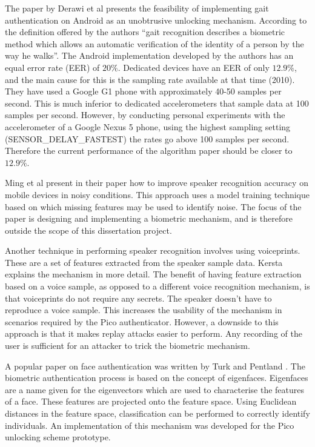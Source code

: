The paper by Derawi et al \cite{derawi2010unobtrusive} presents the feasibility of implementing gait authentication on Android as an unobtrusive unlocking mechanism. According to the definition offered by the authors ``gait recognition describes a biometric method which allows an automatic verification of the identity of a person by the way he walks''. The Android implementation developed by the authors has an equal error rate (EER) of $20\%$. Dedicated devices have an EER of only $12.9\%$, and the main cause for this is the sampling rate available at that time (2010). They have used a Google G1 phone with approximately 40-50 samples per second. This is much inferior to dedicated accelerometers that sample data at 100 samples per second. However, by conducting personal experiments with the accelerometer of a Google Nexus 5 phone, using the highest sampling setting (SENSOR\_DELAY\_FASTEST) the rates go above 100 samples per second. Therefore the current performance of the algorithm paper should be closer to $12.9\%$.

Ming et al \cite{ming2007robust} present in their paper how to improve speaker recognition accuracy on mobile devices in noisy conditions. This approach uses a model training technique based on which missing features may be used to identify noise. The focus of the paper is designing and implementing a biometric mechanism, and is therefore outside the scope of this dissertation project. 

Another technique in performing speaker recognition involves using voiceprints. These are a set of features extracted from the speaker sample data. Kersta \cite{kersta2005voiceprint} explains the mechanism in more detail. The benefit of having feature extraction based on a voice sample, as opposed to a different voice recognition mechanism, is that voiceprints do not require any secrets. The speaker doesn't have to reproduce a voice sample. This increases the usability of the mechanism in scenarios required by the Pico authenticator. However, a downside to this approach is that it makes replay attacks easier to perform. Any recording of the user is sufficient for an attacker to trick the biometric mechanism.

A popular paper on face authentication was written by Turk and Pentland \cite{turk1991face}. The biometric authentication process is based on the concept of eigenfaces. Eigenfaces are a name given for the eigenvectors which are used to characterise the features of a face. These features are projected onto the feature space. Using Euclidean distances in the feature space, classification can be performed to correctly identify individuals. An implementation of this mechanism was developed for the Pico unlocking scheme prototype.


